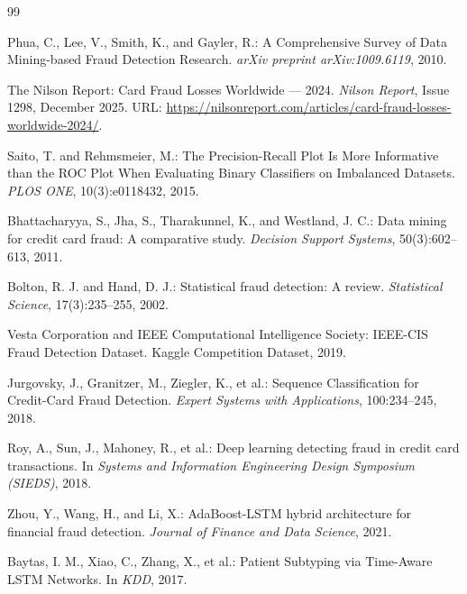 \documentclass[12pt,a4paper]{report}
\begin{document}
\clearpage
{}
{}
\begin{thebibliography}{99}

Phua, C., Lee, V., Smith, K., and Gayler, R.:
\newblock A Comprehensive Survey of Data Mining-based Fraud Detection Research.
\newblock \emph{arXiv preprint arXiv:1009.6119}, 2010.

The Nilson Report:
\newblock Card Fraud Losses Worldwide --- 2024.
\newblock \emph{Nilson Report}, Issue 1298, December 2025.
\newblock URL: \url{https://nilsonreport.com/articles/card-fraud-losses-worldwide-2024/}.

Saito, T. and Rehmsmeier, M.:
\newblock The Precision-Recall Plot Is More Informative than the ROC Plot When Evaluating Binary Classifiers on Imbalanced Datasets.
\newblock \emph{PLOS ONE}, 10(3):e0118432, 2015.

Bhattacharyya, S., Jha, S., Tharakunnel, K., and Westland, J. C.:
\newblock Data mining for credit card fraud: A comparative study.
\newblock \emph{Decision Support Systems}, 50(3):602--613, 2011.

Bolton, R. J. and Hand, D. J.:
\newblock Statistical fraud detection: A review.
\newblock \emph{Statistical Science}, 17(3):235--255, 2002.

Vesta Corporation and IEEE Computational Intelligence Society:
\newblock IEEE-CIS Fraud Detection Dataset.
\newblock Kaggle Competition Dataset, 2019.

Jurgovsky, J., Granitzer, M., Ziegler, K., et al.:
\newblock Sequence Classification for Credit-Card Fraud Detection.
\newblock \emph{Expert Systems with Applications}, 100:234--245, 2018.

Roy, A., Sun, J., Mahoney, R., et al.:
\newblock Deep learning detecting fraud in credit card transactions.
\newblock In \emph{Systems and Information Engineering Design Symposium (SIEDS)}, 2018.

Zhou, Y., Wang, H., and Li, X.:
\newblock AdaBoost-LSTM hybrid architecture for financial fraud detection.
\newblock \emph{Journal of Finance and Data Science}, 2021.

Baytas, I. M., Xiao, C., Zhang, X., et al.:
\newblock Patient Subtyping via Time-Aware LSTM Networks.
\newblock In \emph{KDD}, 2017.


\end{thebibliography}
\end{document}
